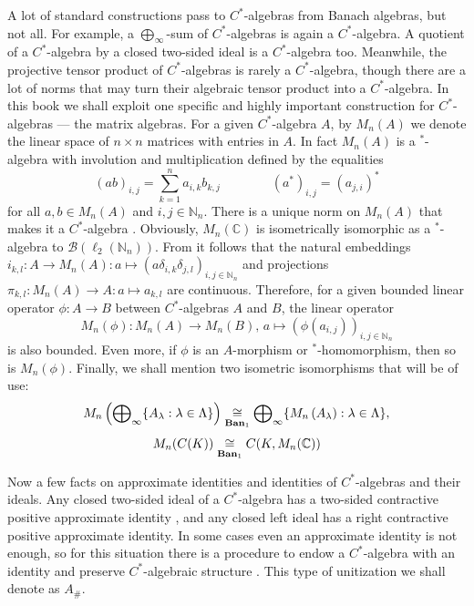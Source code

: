 A lot of standard constructions pass to $C^*$-algebras from Banach algebras, but
not all. For example, a $\bigoplus_\infty$-sum of $C^*$-algebras is again a
$C^*$-algebra. A quotient of a $C^*$-algebra by a closed two-sided ideal is a
$C^*$-algebra too. Meanwhile, the projective tensor product of $C^*$-algebras is
rarely a $C^*$-algebra, though there are a lot of norms that may turn their
algebraic tensor product into a $C^*$-algebra. In this book we shall exploit one
specific and highly important construction for $C^*$-algebras --- the matrix
algebras. For a given $C^*$-algebra $A$, by $M_n(A)$ we denote the linear space
of $n\times n$ matrices with entries in $A$. In fact $M_n(A)$ is a ${}^*$-algebra
with involution and multiplication defined by the equalities 
\[
{(ab)}_{i,j}=\sum_{k=1}^n a_{i,k}b_{k,j}
\qquad\qquad
{(a^*)}_{i,j}={(a_{j,i})}^*
\] 
for all $a,b\in M_n(A)$ and $i,j\in\mathbb{N}_n$. There is a unique norm on
$M_n(A)$ that makes it a $C^*$-algebra \cite[theorem 3.4.2]{MurphyCStarAlgsAndOpTh}. Obviously, $M_n(\mathbb{C})$ is isometrically isomorphic as
a ${}^*$-algebra to $\mathcal{B}(\ell_2(\mathbb{N}_n))$. From
\cite[remark 3.4.1]{MurphyCStarAlgsAndOpTh} it follows that the natural
embeddings 
$i_{k,l}:A\to M_n(A):a\mapsto{(a\delta_{i,k}\delta_{j,l})}_{i,j\in\mathbb{N}_n}$
and projections
$\pi_{k,l}:M_n(A)\to A:a\mapsto a_{k,l}$ are continuous. Therefore, for a given
bounded linear operator $\phi:A\to B$ between $C^*$-algebras $A$ and $B$, the
linear operator 
\[
M_n(\phi):M_n(A)\to M_n(B),\, a\mapsto {(\phi(a_{i,j}))}_{i,j\in\mathbb{N}_n}
\] 
is also bounded. Even more, if $\phi$ is an $A$-morphism or ${}^*$-homomorphism,
then so is $M_n(\phi)$. Finally, we shall mention two isometric isomorphisms
that will be of use:
\[
M_n\left(\bigoplus\nolimits_\infty \{A_\lambda:\lambda\in\Lambda \}\right)
\mathrel{\mathop{\cong}\limits_{\mathbf{Ban}_1}}
\bigoplus\nolimits_\infty \{M_n\left(A_\lambda\right):\lambda\in\Lambda \},
\]
\[
M_n(C(K))\mathrel{\mathop{\cong}\limits_{\mathbf{Ban}_1}}C(K,M_n(\mathbb{C}))
\]

Now a few facts on approximate identities and identities of $C^*$-algebras and
their ideals. Any closed two-sided ideal of a $C^*$-algebra has a two-sided
contractive positive approximate identity \cite[theorem 4.7.79]{HelBanLocConvAlg}, and any closed left ideal has a right contractive positive approximate
identity. In some cases even an approximate identity is not enough, so for this
situation there is a procedure to endow a $C^*$-algebra with an identity and
preserve $C^*$-algebraic structure \cite[proposition 4.7.6]{HelBanLocConvAlg}.
This type of unitization we shall denote as $A_\#$. 

